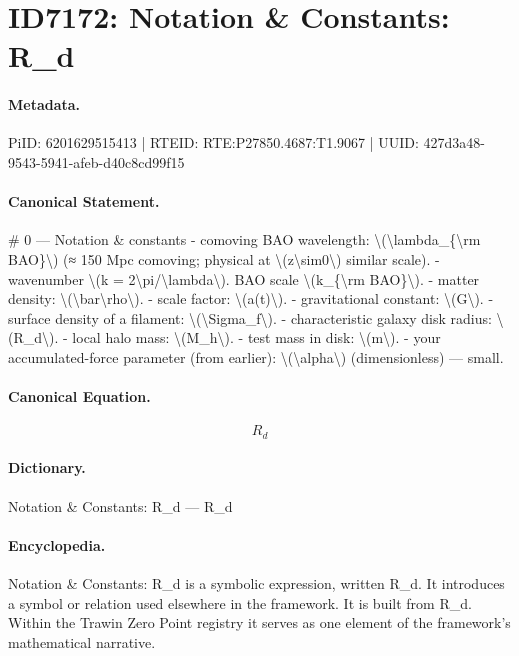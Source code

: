 \section*{ID7172: Notation \& Constants: R\_d}
\paragraph{Metadata.}
PiID: 6201629515413 | RTEID: RTE:P27850.4687:T1.9067 | UUID: 427d3a48-9543-5941-afeb-d40c8cd99f15

\paragraph{Canonical Statement.}
\# 0 — Notation \& constants - comoving BAO wavelength: \textbackslash{}(\textbackslash{}lambda\_\{\textbackslash{}rm BAO\}\textbackslash{}) (≈ 150 Mpc comoving; physical at \textbackslash{}(z\textbackslash{}sim0\textbackslash{}) similar scale). - wavenumber \textbackslash{}(k = 2\textbackslash{}pi/\textbackslash{}lambda\textbackslash{}). BAO scale \textbackslash{}(k\_\{\textbackslash{}rm BAO\}\textbackslash{}). - matter density: \textbackslash{}(\textbackslash{}bar\textbackslash{}rho\textbackslash{}). - scale factor: \textbackslash{}(a(t)\textbackslash{}). - gravitational constant: \textbackslash{}(G\textbackslash{}). - surface density of a filament: \textbackslash{}(\textbackslash{}Sigma\_f\textbackslash{}). - characteristic galaxy disk radius: \textbackslash{}(R\_d\textbackslash{}). - local halo mass: \textbackslash{}(M\_h\textbackslash{}). - test mass in disk: \textbackslash{}(m\textbackslash{}). - your accumulated-force parameter (from earlier): \textbackslash{}(\textbackslash{}alpha\textbackslash{}) (dimensionless) — small.

\paragraph{Canonical Equation.}
\[
R_d
\]

\paragraph{Dictionary.}
Notation \& Constants: R\_d — R\_d

\paragraph{Encyclopedia.}
Notation \& Constants: R\_d is a symbolic expression, written R\_d. It introduces a symbol or relation used elsewhere in the framework. It is built from R\_d. Within the Trawin Zero Point registry it serves as one element of the framework's mathematical narrative.
